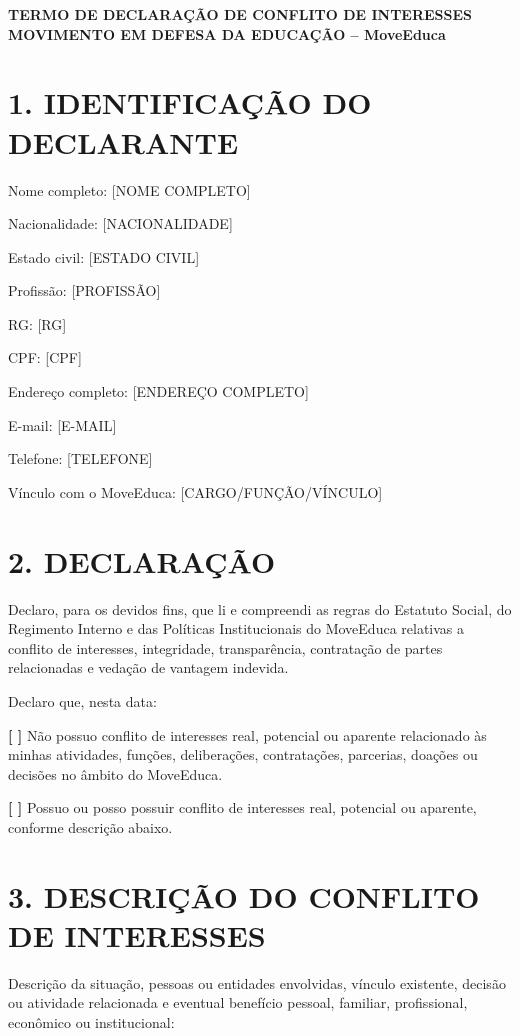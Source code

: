 \documentclass[11pt,a4paper]{article}
\begin{document}
\begin{center}
\textbf{\Large TERMO DE DECLARAÇÃO DE CONFLITO DE INTERESSES}\\
\textbf{\large MOVIMENTO EM DEFESA DA EDUCAÇÃO -- MoveEduca}
\end{center}

\section*{1. IDENTIFICAÇÃO DO DECLARANTE}

Nome completo: [NOME COMPLETO]

Nacionalidade: [NACIONALIDADE]

Estado civil: [ESTADO CIVIL]

Profissão: [PROFISSÃO]

RG: [RG]

CPF: [CPF]

Endereço completo: [ENDEREÇO COMPLETO]

E-mail: [E-MAIL]

Telefone: [TELEFONE]

Vínculo com o MoveEduca: [CARGO/FUNÇÃO/VÍNCULO]

\section*{2. DECLARAÇÃO}

Declaro, para os devidos fins, que li e compreendi as regras do Estatuto Social, do Regimento Interno e das Políticas Institucionais do MoveEduca relativas a conflito de interesses, integridade, transparência, contratação de partes relacionadas e vedação de vantagem indevida.

Declaro que, nesta data:

\textbf{[ \quad ]} Não possuo conflito de interesses real, potencial ou aparente relacionado às minhas atividades, funções, deliberações, contratações, parcerias, doações ou decisões no âmbito do MoveEduca.

\textbf{[ \quad ]} Possuo ou posso possuir conflito de interesses real, potencial ou aparente, conforme descrição abaixo.

\section*{3. DESCRIÇÃO DO CONFLITO DE INTERESSES}

Descrição da situação, pessoas ou entidades envolvidas, vínculo existente, decisão ou atividade relacionada e eventual benefício pessoal, familiar, profissional, econômico ou institucional:
\end{document}
